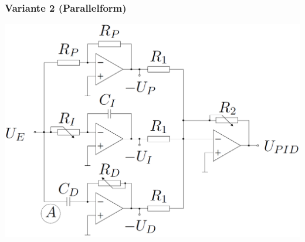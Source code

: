 \subsubsection{Variante 2 (Parallelform)}

\begin{minipage}[c]{0.48\columnwidth}
    \includegraphics[width=\columnwidth]{images/realisierung_pid-regler_variante_2.png}
\end{minipage}
\hfill
\begin{minipage}[c]{0.48\columnwidth}
    
\end{minipage}